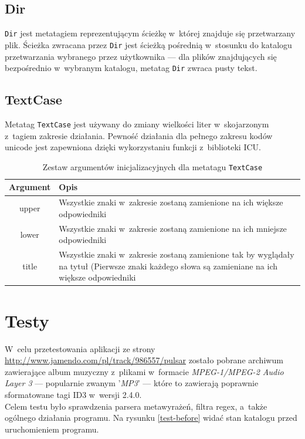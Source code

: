 \subsection{Dir}
\par
\texttt{Dir} jest metatagiem reprezentującym ścieżkę w~której znajduje się przetwarzany plik. Ścieżka zwracana przez \texttt{Dir} jest ścieżką pośrednią w~stosunku do katalogu przetwarzania wybranego przez użytkownika --- dla plików znajdujących się bezpośrednio w~wybranym katalogu, metatag \texttt{Dir} zwraca pusty tekst.

\subsection{TextCase}
\par
Metatag \texttt{TextCase} jest używany do zmiany wielkości liter w~skojarzonym z~tagiem zakresie działania. Pewność działania dla pełnego zakresu kodów unicode jest zapewniona dzięki wykorzystaniu funkcji z~biblioteki ICU.



\begin{table}[h]
\begin{center}
\begin{tabular}{| c | p{13cm} |}
\hline
\textbf{Argument} & \textbf{Opis} \\
\hline
upper & Wszystkie znaki w~zakresie zostaną zamienione na ich większe odpowiedniki \\
lower & Wszystkie znaki w~zakresie zostaną zamienione na ich mniejsze odpowiedniki \\
title & Wszystkie znaki w~zakresie zostaną zamienione tak by wyglądały na tytuł (Pierwsze znaki każdego słowa są zamieniane na ich większe odpowiedniki \\
\hline
\end{tabular} \end{center}
\caption{Zestaw argumentów inicjalizacyjnych dla metatagu \texttt{TextCase}}
\end{table}

\section{Testy}
\label{testy}

\par
 W~celu przetestowania aplikacji ze strony \url{http://www.jamendo.com/pl/track/986557/pulsar} zostało pobrane archiwum zawierające album muzyczny z~plikami w~formacie \textit{MPEG-1/MPEG-2 Audio Layer 3} --- popularnie zwanym '\textit{MP3}' --- które to zawierają poprawnie sformatowane tagi ID3 w~wersji 2.4.0.\\
Celem testu było sprawdzenia parsera metawyrażeń, filtra regex, a~także ogólnego działania programu.
Na rysunku \ref{test-before} widać stan katalogu przed uruchomieniem programu.

